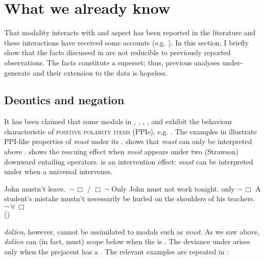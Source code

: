 \documentclass[output=paper,newtxmath,colorlinks,citecolor=brown]{langsci/langscibook}
\begin{document}
\section{What we already know}\label{sect:preliminaries}
That  modality interacts with  and aspect has been reported in the literature and these interactions have received some accounts (e.g. \citealt{han99,nin05,iatzei13}). In this section, I briefly show that the  facts discussed in  are not reducible to previously reported observations. The  facts constitute a superset; thus, previous  analyses under-generate and their extension to the  data is hopeless.

\subsection{Deontics and negation}\label{subsect:deonneg}
It has been claimed that some  modals in , , , , and  exhibit the behaviour characteristic of \textsc{positive polarity items} (PPIs), e.g. \cite{hom11,iatzei10,iatzei13}. The examples in  illustrate  PPI-like properties of  \textit{must} under its .  shows that \textit{must} can only be interpreted above .  shows the rescuing effect when \textit{must} appears under two (Strawson) downward entailing operators.  is an intervention effect: \textit{must} can be interpreted under  when a universal  intervenes.

\ea \label{modalppis} \ea John mustn't leave. \hfill {} $\,\neg\  \Box$ /  $\Box\ \neg$ \label{modalppisa}
        \ex Only John must not work tonight. \hfill only $\neg\ \Box$ \label{modalppisb}
        \ex A student's mistake mustn't necessarily be hurled on the shoulders of his teachers. \hfill $\neg\ \forall\ \Box$ \label{modalppisc}\\
        \hfill (\citealt[543, 539]{iatzei13})
        \z \z

\noindent {} \textit{dolžen}, however, cannot be assimilated to   modals such as  \textit{must}. As we saw above, \textit{dolžen} can (in fact, must) scope below  when the  is . The deviance under  arises only when the prejacent has a  . The relevant examples are repeated in :
\end{document}
